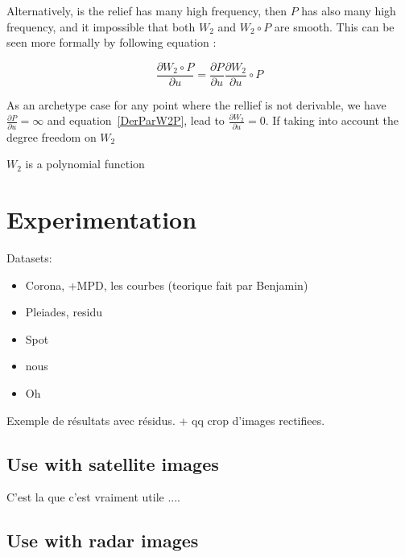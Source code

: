 \documentclass{ipol}
\newcommand{\DerPart}[2]{\frac{\partial #1}{\partial #2}}
\begin{document}
Alternatively, is the relief has many high frequency, then $P$ has also many high frequency,
and it impossible that both  $W_2$ and $W_2 \circ P$ are smooth. This can be seen more formally
by following equation :

\begin{equation}
   \DerPart{W_2 \circ P}{u} = \DerPart{P}{u} \DerPart{W_2} {u} \circ P  \label{DerParW2P}
\end{equation}

As an archetype case for any point where the rellief is not derivable,
we have $ \DerPart{P}{u}= \infty$ and equation~\ref{DerParW2P}, lead to $ \DerPart{W_2} {u}=0$.
If taking into account the degree freedom on $W_2$

 $W_2$ is a polynomial function 








\section{Experimentation}

Datasets:
\begin{itemize}
\item Corona, +MPD, les courbes (teorique fait par Benjamin)
\item Pleiades, residu 
\item Spot
\end{itemize}

\begin{itemize}
\item nous
\item Oh
\end{itemize}

Exemple de résultats avec résidus. + qq crop d'images rectifiees.

\subsection{Use with satellite images}

C'est la que c'est vraiment utile .... 


\subsection{Use with radar images}
\end{document}
